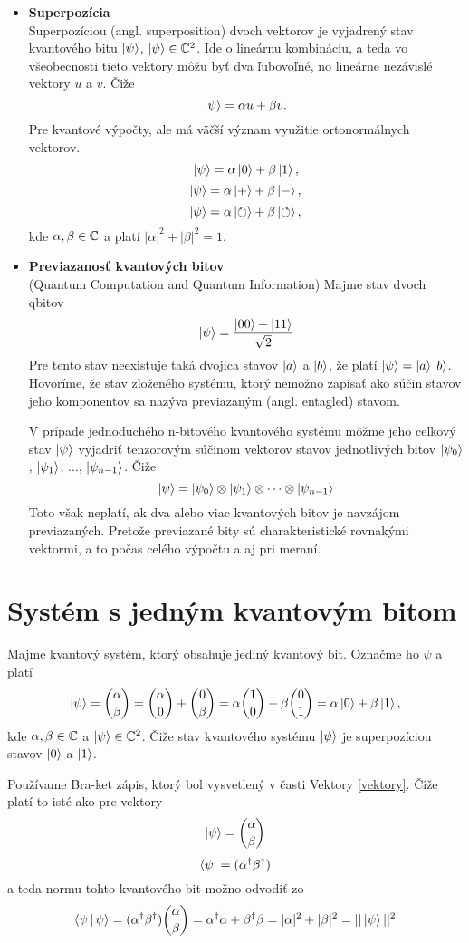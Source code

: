 \begin{itemize}
\item[] \textbf{Superpozícia} \\
Superpozíciou (angl. superposition) dvoch vektorov je vyjadrený stav kvantového bitu \(\Ket{\psi}\), \(\Ket{\psi} \in \mathbb{C}^2\).
Ide o lineárnu kombináciu, a teda vo všeobecnosti tieto vektory môžu byť dva ľubovoľné, no lineárne nezávislé vektory \(u\) a \(v\). Čiže
\[\Ket{\psi} = \alpha u + \beta v.\]
Pre kvantové výpočty, ale má väčší význam využitie ortonormálnych vektorov.
\[\Ket{\psi} = \alpha \Ket{0} + \beta \Ket{1},\]
\[\Ket{\psi} = \alpha \Ket{+} + \beta \Ket{-},\]
\[\Ket{\psi} = \alpha \Ket{\circlearrowright} + \beta \Ket{\circlearrowleft},\]
kde \(\alpha, \beta \in \mathbb{C}\) a platí \(|\alpha|^2 + |\beta|^2 = 1\).

\item[] \textbf{Previazanosť kvantových bitov} \\
(Quantum Computation and Quantum Information) Majme stav dvoch qbitov
\[\Ket{\psi} = \frac{\Ket{00} + \Ket{11}}{\sqrt{2}}\]
Pre tento stav neexistuje taká dvojica stavov \(\Ket{a}\) a \(\Ket{b}\), že platí \(\Ket{\psi} = \Ket{a}\Ket{b}\).
Hovoríme, že stav zloženého systému, ktorý nemožno zapísať ako súčin stavov jeho komponentov sa nazýva previazaným (angl. entagled) stavom.

V prípade jednoduchého n-bitového kvantového systému môžme jeho celkový stav \(\Ket{\psi}\) vyjadriť tenzorovým súčinom vektorov stavov jednotlivých bitov \(\Ket{\psi_0}\), \(\Ket{\psi_1}\), \(\dots\), \(\Ket{\psi_{n-1}}\).
Čiže
\[\Ket{\psi} = \Ket{\psi_0} \otimes \Ket{\psi_1} \otimes \dots \otimes \Ket{\psi_{n-1}}\]
Toto však neplatí, ak dva alebo viac kvantových bitov je navzájom previazaných.
Pretože previazané bity sú charakteristické rovnakými vektormi, a to počas celého výpočtu a aj pri meraní.
\end{itemize}

\section{Systém s jedným kvantovým bitom}
Majme kvantový systém, ktorý obsahuje jediný kvantový bit. Označme ho \(\psi\)
a platí
\[\Ket{\psi} = \binom{\alpha}{\beta} = \binom{\alpha}{0} + \binom{0}{\beta} = \alpha \binom{1}{0} + \beta \binom{0}{1} = \alpha \Ket{0} + \beta \Ket{1}, \]
kde \(\alpha, \beta \in \mathbb{C}\) a \(\Ket{\psi} \in \mathbb{C}^{2}\).
Čiže stav kvantového systému \(\Ket{\psi}\) je superpozíciou stavov \(\Ket{0}\) a \(\Ket{1}\).

Používame Bra-ket zápis, ktorý bol vysvetlený v časti Vektory \ref{vektory}. 
Čiže platí to isté ako pre vektory
\[\Ket{\psi} = \binom{\alpha}{\beta}\]
\[\Bra{\psi} = (\alpha^{\dag}\beta^{\dag})\]
a teda normu tohto kvantového bit možno odvodiť zo
\[\Braket{\psi|\psi} = (\alpha^{\dag}\beta^{\dag})\binom{\alpha}{\beta} = \alpha^{\dag}\alpha + \beta^{\dag}\beta = |\alpha|^{2} + |\beta|^{2} = ||\Ket{\psi}||^{2}\]

